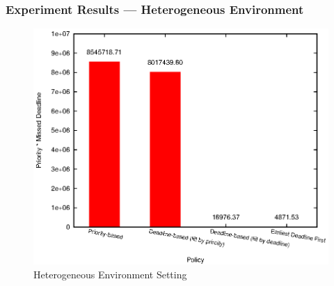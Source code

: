 \begin{frame}
  \frametitle{Experiment Results --- Heterogeneous Environment}
  \begin{figure}[htbp]
    \centering
    \includegraphics[width=\textwidth,height=0.7\textheight,keepaspectratio]{figures/hetero.eps}
    \caption{Heterogeneous Environment Setting}
  \end{figure}
\end{frame}

